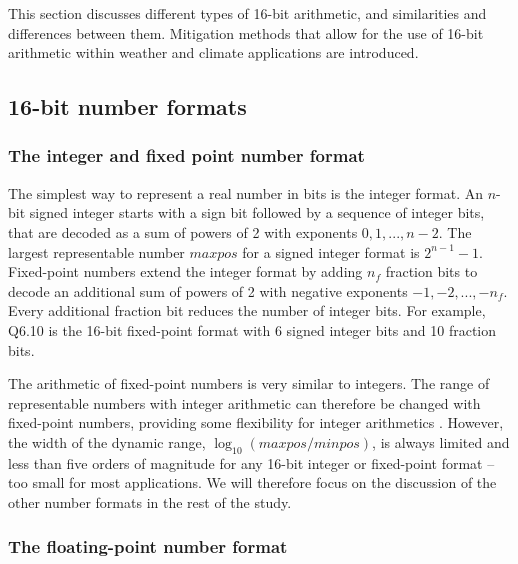 \documentclass[draft]{agujournal2019}
\begin{document}
This section discusses different types of 16-bit arithmetic, and similarities
and differences between them. Mitigation methods that allow for the use of
16-bit arithmetic within weather and climate applications are introduced.

\subsection{16-bit number formats}

\subsubsection{The integer and fixed point number format}
\label{sec:integer}

The simplest way to represent a real number in bits is the integer format.
An $n$-bit signed integer starts with a sign bit followed by a sequence of integer
bits, that are decoded as a sum of powers of 2 with exponents $0,1,...,n-2$.
The largest representable number $maxpos$ for a signed integer format is $2^{n-1}-1$.
Fixed-point numbers extend the integer format by adding $n_f$ fraction bits to
decode an additional sum of powers of 2 with negative exponents $-1,-2,...,-n_f$.
Every additional fraction bit reduces the number of integer bits. For example,
Q6.10 is the 16-bit fixed-point format with 6 signed integer bits and 10 fraction bits.

The arithmetic of fixed-point numbers is very similar to integers. The range of
representable numbers with integer arithmetic can therefore be
changed with fixed-point numbers, providing some flexibility for integer arithmetics
\cite{Russell2017}. However, the width of the dynamic range, $\log_{10}(maxpos/minpos)$,
is always limited and less than five orders of magnitude for any 16-bit integer
or fixed-point format -- too small for most applications. We will therefore focus
on the discussion of the other number formats in the rest of the study.

\subsubsection{The floating-point number format}
\label{sec:floats}
\end{document}
